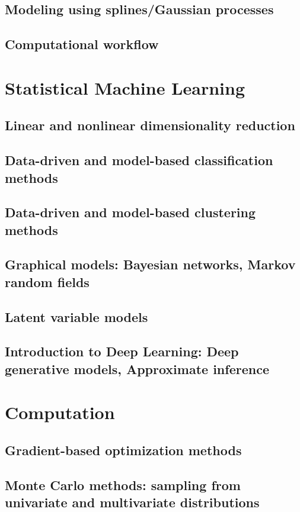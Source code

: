 \documentclass{article}
\begin{document}
\subsection{Modeling using splines/Gaussian processes}
\subsection{Computational workflow}

\section{Statistical Machine Learning}
\subsection{Linear and nonlinear dimensionality reduction}
\subsection{Data-driven and model-based classification methods}
\subsection{Data-driven and model-based clustering methods}
\subsection{Graphical models: Bayesian networks, Markov random fields}
\subsection{Latent variable models}
\subsection{Introduction to Deep Learning: Deep generative models, Approximate inference}

\section{Computation}
\subsection{Gradient-based optimization methods}
\subsection{Monte Carlo methods: sampling from univariate and multivariate distributions}
\end{document}
